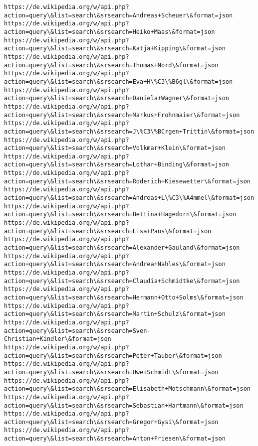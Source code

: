 \documentclass[11pt]{article}
\begin{document}
\begin{Verbatim}[commandchars=\\\{\}]
https://de.wikipedia.org/w/api.php?action=query\&list=search\&srsearch=Andreas+Scheuer\&format=json
https://de.wikipedia.org/w/api.php?action=query\&list=search\&srsearch=Heiko+Maas\&format=json
https://de.wikipedia.org/w/api.php?action=query\&list=search\&srsearch=Katja+Kipping\&format=json
https://de.wikipedia.org/w/api.php?action=query\&list=search\&srsearch=Thomas+Nord\&format=json
https://de.wikipedia.org/w/api.php?action=query\&list=search\&srsearch=Eva+H\%C3\%B6gl\&format=json
https://de.wikipedia.org/w/api.php?action=query\&list=search\&srsearch=Daniela+Wagner\&format=json
https://de.wikipedia.org/w/api.php?action=query\&list=search\&srsearch=Markus+Frohnmaier\&format=json
https://de.wikipedia.org/w/api.php?action=query\&list=search\&srsearch=J\%C3\%BCrgen+Trittin\&format=json
https://de.wikipedia.org/w/api.php?action=query\&list=search\&srsearch=Volkmar+Klein\&format=json
https://de.wikipedia.org/w/api.php?action=query\&list=search\&srsearch=Lothar+Binding\&format=json
https://de.wikipedia.org/w/api.php?action=query\&list=search\&srsearch=Roderich+Kiesewetter\&format=json
https://de.wikipedia.org/w/api.php?action=query\&list=search\&srsearch=Andreas+L\%C3\%A4mmel\&format=json
https://de.wikipedia.org/w/api.php?action=query\&list=search\&srsearch=Bettina+Hagedorn\&format=json
https://de.wikipedia.org/w/api.php?action=query\&list=search\&srsearch=Lisa+Paus\&format=json
https://de.wikipedia.org/w/api.php?action=query\&list=search\&srsearch=Alexander+Gauland\&format=json
https://de.wikipedia.org/w/api.php?action=query\&list=search\&srsearch=Andrea+Nahles\&format=json
https://de.wikipedia.org/w/api.php?action=query\&list=search\&srsearch=Claudia+Schmidtke\&format=json
https://de.wikipedia.org/w/api.php?action=query\&list=search\&srsearch=Hermann+Otto+Solms\&format=json
https://de.wikipedia.org/w/api.php?action=query\&list=search\&srsearch=Martin+Schulz\&format=json
https://de.wikipedia.org/w/api.php?action=query\&list=search\&srsearch=Sven-Christian+Kindler\&format=json
https://de.wikipedia.org/w/api.php?action=query\&list=search\&srsearch=Peter+Tauber\&format=json
https://de.wikipedia.org/w/api.php?action=query\&list=search\&srsearch=Uwe+Schmidt\&format=json
https://de.wikipedia.org/w/api.php?action=query\&list=search\&srsearch=Elisabeth+Motschmann\&format=json
https://de.wikipedia.org/w/api.php?action=query\&list=search\&srsearch=Sebastian+Hartmann\&format=json
https://de.wikipedia.org/w/api.php?action=query\&list=search\&srsearch=Gregor+Gysi\&format=json
https://de.wikipedia.org/w/api.php?action=query\&list=search\&srsearch=Anton+Friesen\&format=json

\end{Verbatim}
\end{document}
